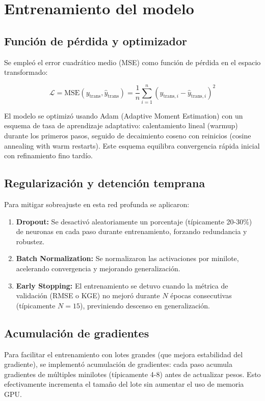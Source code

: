 \section{Entrenamiento del modelo}
\label{sec:entrenamiento_modelo}

\subsection{Función de pérdida y optimizador}
Se empleó el error cuadrático medio (MSE) como función de pérdida en el espacio transformado:

\begin{equation}
    \mathcal{L} = \text{MSE}(y_{\text{trans}}, \hat{y}_{\text{trans}}) = \frac{1}{n} \sum_{i=1}^{n} (y_{\text{trans}, i} - \hat{y}_{\text{trans}, i})^2
\end{equation}

El modelo se optimizó usando Adam (Adaptive Moment Estimation) con un esquema de tasa de aprendizaje adaptativo: calentamiento lineal (warmup) durante los primeros pasos, seguido de decaimiento coseno con reinicios (cosine annealing with warm restarts). Este esquema equilibra convergencia rápida inicial con refinamiento fino tardío.

\subsection{Regularización y detención temprana}
Para mitigar sobreajuste en esta red profunda se aplicaron:

\begin{enumerate}
    \item \textbf{Dropout:} Se desactivó aleatoriamente un porcentaje (típicamente 20-30\%) de neuronas en cada paso durante entrenamiento, forzando redundancia y robustez.
    \item \textbf{Batch Normalization:} Se normalizaron las activaciones por minilote, acelerando convergencia y mejorando generalización.
    \item \textbf{Early Stopping:} El entrenamiento se detuvo cuando la métrica de validación (RMSE o KGE) no mejoró durante $N$ épocas consecutivas (típicamente $N=15$), previniendo descenso en generalización.
\end{enumerate}

\subsection{Acumulación de gradientes}
Para facilitar el entrenamiento con lotes grandes (que mejora estabilidad del gradiente), se implementó acumulación de gradientes: cada paso acumula gradientes de múltiples minilotes (típicamente 4-8) antes de actualizar pesos. Esto efectivamente incrementa el tamaño del lote sin aumentar el uso de memoria GPU.


